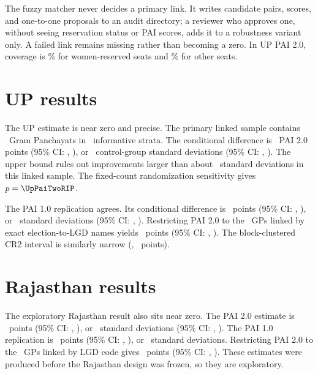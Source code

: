 \documentclass[12pt]{article}
\begin{document}
The fuzzy matcher never decides a primary link. It writes candidate pairs, scores, and one-to-one proposals to an audit directory; a reviewer who approves one, without seeing reservation status or PAI scores, adds it to a robustness variant only. A failed link remains missing rather than becoming a zero. In UP PAI 2.0, coverage is \UpPaiTwoWomenMatchPct\% for women-reserved seats and \UpPaiTwoOpenMatchPct\% for other seats.

\section{UP results}

The UP estimate is near zero and precise. The primary linked sample contains \UpPaiTwoN\ Gram Panchayats in \UpPaiTwoStrata\ informative strata. The conditional difference is \UpPaiTwoDifference\ PAI 2.0 points (95\% CI: \UpPaiTwoCILow, \UpPaiTwoCIHigh), or \UpPaiTwoDifferenceSD\ control-group standard deviations (95\% CI: \UpPaiTwoCILowSD, \UpPaiTwoCIHighSD). The upper bound rules out improvements larger than about \UpPaiTwoCIHighSD\ standard deviations in this linked sample. The fixed-count randomization sensitivity gives $p=\UpPaiTwoRIP$.

The PAI 1.0 replication agrees. Its conditional difference is \UpPaiOneDifference\ points (95\% CI: \UpPaiOneCILow, \UpPaiOneCIHigh), or \UpPaiOneDifferenceSD\ standard deviations (95\% CI: \UpPaiOneCILowSD, \UpPaiOneCIHighSD). Restricting PAI 2.0 to the \UpPaiTwoExactN\ GPs linked by exact election-to-LGD names yields \UpPaiTwoExactDifference\ points (95\% CI: \UpPaiTwoExactCILow, \UpPaiTwoExactCIHigh). The block-clustered CR2 interval is similarly narrow (\UpPaiTwoCRTwoCILow, \UpPaiTwoCRTwoCIHigh\ points).

\begin{table}[htbp]
\centering
\caption{Women's reservations and UP PAI Good Governance}
\label{tab:up_pai_effects}
\small

\end{table}

\section{Rajasthan results}

The exploratory Rajasthan result also sits near zero. The PAI 2.0 estimate is \RajPaiTwoDifference\ points (95\% CI: \RajPaiTwoCILow, \RajPaiTwoCIHigh), or \RajPaiTwoDifferenceSD\ standard deviations (95\% CI: \RajPaiTwoCILowSD, \RajPaiTwoCIHighSD). The PAI 1.0 replication is \RajPaiOneDifference\ points (95\% CI: \RajPaiOneCILow, \RajPaiOneCIHigh), or \RajPaiOneDifferenceSD\ standard deviations. Restricting PAI 2.0 to the \RajPaiTwoCodeLinkN\ GPs linked by LGD code gives \RajPaiTwoCodeLinkDifference\ points (95\% CI: \RajPaiTwoCodeLinkCILow, \RajPaiTwoCodeLinkCIHigh). These estimates were produced before the Rajasthan design was frozen, so they are exploratory.
\end{document}
